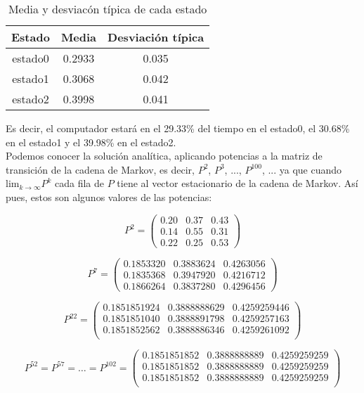 \documentclass[12pt,a4paper,twoside,openright,titlepage,final]{article}
\begin{document}
\begin{table}[htbp!]
	\centering
	\caption{Media y desviacón típica de cada estado}
	\label{tbl:comp}
	\begin{tabular}{@{}ccc@{}}
		\toprule
		\textbf{Estado} & \textbf{Media} & \textbf{Desviación típica} \\ \midrule
		estado0         & 0.2933         & 0.035                      \\
		estado1         & 0.3068         & 0.042                      \\
		estado2         & 0.3998         & 0.041                      \\ \bottomrule
	\end{tabular}
\end{table}

Es decir, el computador estará en el 29.33\% del tiempo en el estado0, el 30.68\% en el estado1 y el 39.98\% en el estado2.\\

Podemos conocer la solución analítica, aplicando potencias a la matriz de transición de la cadena de Markov, es decir, $P^2$, $P^3$, ..., $P^{100}$, ... ya que cuando $\mathrm{lim}_{k \to \infty} P^k$ cada fila de $P$ tiene al vector estacionario de la cadena de Markov. Así pues, estos son algunos valores de las potencias:

\[ P^2 = \left(\begin{array}{ccc}
0.20 & 0.37 & 0.43 \\
0.14 & 0.55 & 0.31 \\
0.22 & 0.25 & 0.53
\end{array}\right) \]

\[ P^7 = \left(\begin{array}{ccc}
0.1853320 & 0.3883624 & 0.4263056 \\
0.1835368 & 0.3947920 & 0.4216712 \\
0.1866264 & 0.3837280 & 0.4296456
\end{array}\right) \]

\[ P^{22} = \left(\begin{array}{ccc}
0.1851851924 & 0.3888888629 & 0.4259259446 \\
0.1851851040 & 0.3888891798 & 0.4259257163 \\
0.1851852562 & 0.3888886346 & 0.4259261092 \\
\end{array}\right) \]

\[ P^{52} = P^{57} = \dots = P^{102} = \left(\begin{array}{ccc}
0.1851851852 & 0.3888888889 & 0.4259259259 \\
0.1851851852 & 0.3888888889 & 0.4259259259 \\
0.1851851852 & 0.3888888889 & 0.4259259259 \\
\end{array}\right) \]
\end{document}
